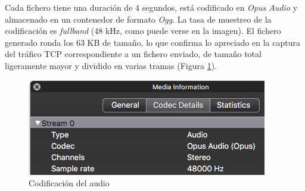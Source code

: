 Cada fichero tiene una duración de 4 segundos, está codificado en \emph{Opus Audio} \cite{OpusCodec} y almacenado en un contenedor de formato \emph{Ogg}. La tasa de muestreo de la codificación es \emph{fullband} (48 kHz, como puede verse en la imagen). El fichero generado ronda los 63 KB de tamaño, lo que confirma lo apreciado en la captura del tráfico TCP correspondiente a un fichero enviado, de tamaño total ligeramente mayor y dividido en varias tramas (Figura \ref{audioInfo}).

\begin{figure}[!t]
\begin{center}
\includegraphics[width=0.5\linewidth]{./6_EvalEmpirica/Img/audioInfo.png}
\end{center}
\caption{Codificación del audio}
\label{audioInfo}
\end{figure}